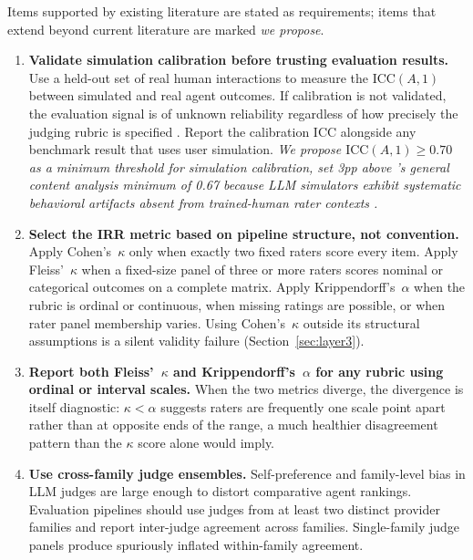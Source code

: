\documentclass[preprint,12pt]{elsarticle}
\newcommand{\ka}{Krippendorff's~$\alpha$}
\newcommand{\fk}{Fleiss'~$\kappa$}
\newcommand{\ck}{Cohen's~$\kappa$}
\newcommand{\icc}{\text{ICC}(A,1)}
\begin{document}
Items supported by existing literature are stated as requirements; items that extend
beyond current literature are marked \emph{we propose}.

\begin{enumerate}

\item \textbf{Validate simulation calibration before trusting evaluation results.}
Use a held-out set of real human interactions to measure the $\icc$ between simulated
and real agent outcomes. If calibration is not validated, the evaluation signal is of
unknown reliability regardless of how precisely the judging rubric is specified
\citep{seshadri2026}. Report the calibration ICC alongside any benchmark result that
uses user simulation. \emph{We propose $\icc \geq 0.70$ as a minimum threshold for
simulation calibration, set 3pp above \citet{krippendorff2004}'s general content
analysis minimum of 0.67 because LLM simulators exhibit systematic behavioral
artifacts absent from trained-human rater contexts \citep{seshadri2026}.}

\item \textbf{Select the IRR metric based on pipeline structure, not convention.}
Apply \ck{} only when exactly two fixed raters score every item. Apply \fk{} when a
fixed-size panel of three or more raters scores nominal or categorical outcomes on a
complete matrix. Apply \ka{} when the rubric is ordinal or continuous, when missing
ratings are possible, or when rater panel membership varies. Using \ck{} outside its
structural assumptions is a silent validity failure (Section~\ref{sec:layer3}).

\item \textbf{Report both \fk{} and \ka{} for any rubric using ordinal or interval
scales.} When the two metrics diverge, the divergence is itself diagnostic:
$\kappa < \alpha$ suggests raters are frequently one scale point apart rather than at
opposite ends of the range, a much healthier disagreement pattern than the $\kappa$
score alone would imply.

\item \textbf{Use cross-family judge ensembles.} Self-preference and family-level
bias in LLM judges \citep{spiliopoulou2025,wataoka2024} are large enough to distort
comparative agent rankings. Evaluation pipelines should use judges from at least two
distinct provider families and report inter-judge agreement across families.
Single-family judge panels produce spuriously inflated within-family agreement.


\end{enumerate}
\end{document}

